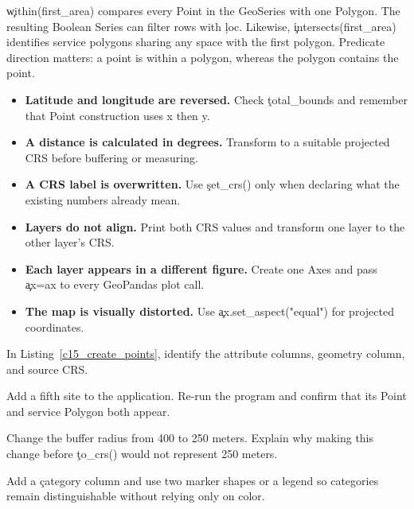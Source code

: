 \c{within(first_area)} compares every Point in the GeoSeries with one Polygon.
The resulting Boolean Series can filter rows with \c{loc}. Likewise,
\c{intersects(first_area)} identifies service polygons sharing any space with
the first polygon. Predicate direction matters: a point is within a polygon,
whereas the polygon contains the point.


\begin{itemize}
    \item \textbf{Latitude and longitude are reversed.} Check \c{total_bounds}
          and remember that Point construction uses x then y.
    \item \textbf{A distance is calculated in degrees.} Transform to a suitable
          projected CRS before buffering or measuring.
    \item \textbf{A CRS label is overwritten.} Use \c{set_crs()} only when
          declaring what the existing numbers already mean.
    \item \textbf{Layers do not align.} Print both CRS values and transform one
          layer to the other layer's CRS.
    \item \textbf{Each layer appears in a different figure.} Create one Axes and
          pass \c{ax=ax} to every GeoPandas plot call.
    \item \textbf{The map is visually distorted.} Use \c{ax.set_aspect("equal")}
          for projected coordinates.
\end{itemize}



In Listing~\ref{c15_create_points}, identify the attribute columns, geometry
column, and source CRS.


Add a fifth site to the application. Re-run the program and confirm that its
Point and service Polygon both appear.


Change the buffer radius from 400 to 250 meters. Explain why making this change
before \c{to_crs()} would not represent 250 meters.


Add a \c{category} column and use two marker shapes or a legend so categories
remain distinguishable without relying only on color.

